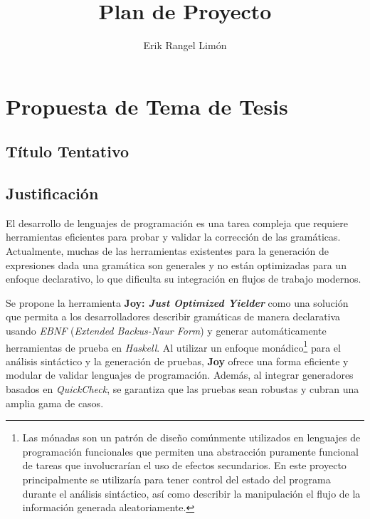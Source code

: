 \documentclass[12pt]{article}
\title{Plan de Proyecto}
\author{Erik Rangel Limón}
\date{}
\begin{document}

\maketitle

\section*{Propuesta de Tema de Tesis}

\subsection*{Título Tentativo}


\subsection*{Justificación}

El desarrollo de lenguajes de programación es una tarea compleja que requiere herramientas eficientes para probar y validar la corrección de las gramáticas. Actualmente, muchas de las herramientas existentes para la generación de expresiones dada una gramática son generales y no están optimizadas para un enfoque declarativo, lo que dificulta su integración en flujos de trabajo modernos.

Se propone la herramienta \textbf{Joy: \textit{Just Optimized Yielder}} como una solución que permita a los desarrolladores describir gramáticas de manera declarativa usando \textit{EBNF} (\textit{Extended Backus-Naur Form}) y generar automáticamente herramientas de prueba en \textit{Haskell}. Al utilizar un enfoque monádico\footnote[1]{Las mónadas son un patrón de diseño comúnmente utilizados en lenguajes de programación funcionales que permiten una abstracción puramente funcional de tareas que involucrarían el uso de efectos secundarios. En este proyecto principalmente se utilizaría para tener control del estado del programa durante el análisis sintáctico, así como describir la manipulación el flujo de la información generada aleatoriamente.} para el análisis sintáctico y la generación de pruebas, \textbf{Joy} ofrece una forma eficiente y modular de validar lenguajes de programación. Además, al integrar generadores basados en \textit{QuickCheck}, se garantiza que las pruebas sean robustas y cubran una amplia gama de casos.
\end{document}
